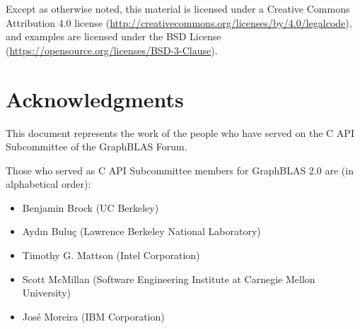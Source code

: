 \documentclass[11pt]{extbook}
\begin{document}


\vspace{1.5cm}



Except as otherwise noted, this material is licensed under a Creative Commons Attribution 4.0 license (\href{http://creativecommons.org/licenses/by/4.0/legalcode}{http://creativecommons.org/licenses/by/4.0/legalcode}), 
and examples are licensed under the BSD License (\href{https://opensource.org/licenses/BSD-3-Clause}{https://opensource.org/licenses/BSD-3-Clause}).


\vfill

\pagebreak
\tableofcontents
\vfill
\pagebreak

\listoftables
\vfill
\pagebreak

\listoffigures
\vfill
\pagebreak


\section*{Acknowledgments}

This document represents the work of the people who have served on the C API
Subcommittee of the GraphBLAS Forum.

Those who served as C API Subcommittee members for GraphBLAS 2.0 are (in alphabetical order):
\begin{itemize}
\item Benjamin Brock (UC Berkeley)
\item Ayd\i n Bulu\c{c} (Lawrence Berkeley National Laboratory)
\item Timothy G. Mattson (Intel Corporation)
\item Scott McMillan (Software Engineering Institute at Carnegie Mellon University)
\item Jos\'e Moreira (IBM Corporation)
\end{itemize}
\end{document}
